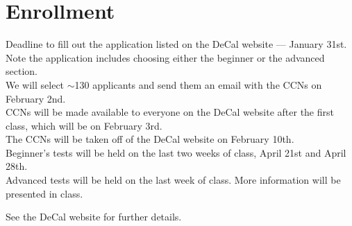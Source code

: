 \documentclass[11pt]{article}
\begin{document}
\section*{Enrollment}
Deadline to fill out the application listed on the DeCal website — January 31st.\\
Note the application includes choosing either the beginner or the advanced section.\\
We will select $\sim$130 applicants and send them an email with the CCNs on February 2nd.\\
CCNs will be made available to everyone on the DeCal website after the first class, which will be on February 3rd.\\
The CCNs will be taken off of the DeCal website on February 10th.\\
Beginner’s tests will be held on the last two weeks of class, April 21st and April 28th.\\
Advanced tests will be held on the last week of class. More information will be presented in class.

See the DeCal website for further details.
\end{document}
